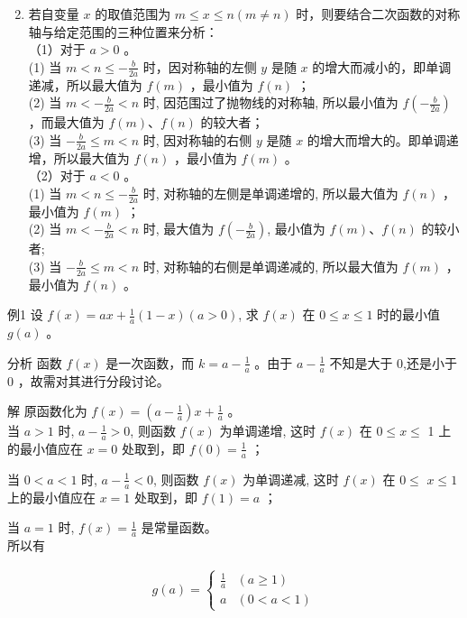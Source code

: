 \documentclass[10pt]{article}
\begin{document}
\begin{enumerate}
  \setcounter{enumi}{1}
  \item 若自变量 $x$ 的取值范围为 $m \leqslant x \leqslant n(m \neq n)$ 时，则要结合二次函数的对称轴与给定范围的三种位置来分析：\\
（1）对于 $a>0$ 。\\
(1) 当 $m<n \leqslant-\frac{b}{2 a}$ 时，因对称轴的左侧 $y$ 是随 $x$ 的增大而减小的，即单调递减，所以最大值为 $f(m)$ ，最小值为 $f(n)$ ；\\
(2) 当 $m<-\frac{b}{2 a}<n$ 时, 因范围过了抛物线的对称轴, 所以最小值为 $f\left(-\frac{b}{2 a}\right)$ ，而最大值为 $f(m) 、 f(n)$ 的较大者；\\
(3) 当 $-\frac{b}{2 a} \leqslant m<n$ 时, 因对称轴的右侧 $y$ 是随 $x$ 的增大而增大的。即单调递增，所以最大值为 $f(n)$ ，最小值为 $f(m)$ 。\\
（2）对于 $a<0$ 。\\
(1) 当 $m<n \leqslant-\frac{b}{2 a}$ 时, 对称轴的左侧是单调递增的, 所以最大值为 $f(n)$ ，最小值为 $f(m)$ ；\\
(2) 当 $m<-\frac{b}{2 a}<n$ 时, 最大值为 $f\left(-\frac{b}{2 a}\right)$, 最小值为 $f(m) 、 f(n)$ 的较小者;\\
(3) 当 $-\frac{b}{2 a} \leqslant m<n$ 时, 对称轴的右侧是单调递减的, 所以最大值为 $f(m)$ ，最小值为 $f(n)$ 。
\end{enumerate}

例1 设 $f(x)=a x+\frac{1}{a}(1-x)(a>0)$, 求 $f(x)$ 在 $0 \leqslant x \leqslant 1$ 时的最小值 $g(a)$ 。

分析 函数 $f(x)$ 是一次函数，而 $k=a-\frac{1}{a}$ 。由于 $a-\frac{1}{a}$ 不知是大于 0,还是小于 0 ，故需对其进行分段讨论。

解 原函数化为 $f(x)=\left(a-\frac{1}{a}\right) x+\frac{1}{a}$ 。\\
当 $a>1$ 时, $a-\frac{1}{a}>0$, 则函数 $f(x)$ 为单调递增, 这时 $f(x)$ 在 $0 \leqslant x \leqslant$ 1 上的最小值应在 $x=0$ 处取到，即 $f(0)=\frac{1}{a}$ ；

当 $0<a<1$ 时, $a-\frac{1}{a}<0$, 则函数 $f(x)$ 为单调递减, 这时 $f(x)$ 在 $0 \leqslant$ $x \leqslant 1$ 上的最小值应在 $x=1$ 处取到，即 $f(1)=a$ ；

当 $a=1$ 时, $f(x)=\frac{1}{a}$ 是常量函数。\\
所以有

\begin{align*}
g(a)= \begin{cases}\frac{1}{a} & (a \geqslant 1) \\ a & (0<a<1)\end{cases}
\end{align*}
\end{document}
